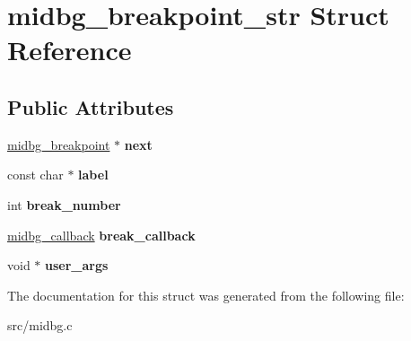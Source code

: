 \hypertarget{structmidbg__breakpoint__str}{\section{midbg\-\_\-breakpoint\-\_\-str Struct Reference}
\label{structmidbg__breakpoint__str}
}
\subsection*{Public Attributes}
\begin{DoxyCompactItemize}
\item 
\hypertarget{structmidbg__breakpoint__str_a5b4f031689f4d84a4a1595e3decefec9}{\hyperlink{structmidbg__breakpoint}{midbg\-\_\-breakpoint} $\ast$ {\bfseries next}}\label{structmidbg__breakpoint__str_a5b4f031689f4d84a4a1595e3decefec9}

\item 
\hypertarget{structmidbg__breakpoint__str_af8a9dab54aed426b08ccf347bef22425}{const char $\ast$ {\bfseries label}}\label{structmidbg__breakpoint__str_af8a9dab54aed426b08ccf347bef22425}

\item 
\hypertarget{structmidbg__breakpoint__str_a3b1c78216b7e95b8aa2ed072250e9a94}{int {\bfseries break\-\_\-number}}\label{structmidbg__breakpoint__str_a3b1c78216b7e95b8aa2ed072250e9a94}

\item 
\hypertarget{structmidbg__breakpoint__str_a459b356a16639d66b80c2b48061d151a}{\hyperlink{midbg_8h_a1adf2f9f07b16e2cd3208b507cfc8e9c}{midbg\-\_\-callback} {\bfseries break\-\_\-callback}}\label{structmidbg__breakpoint__str_a459b356a16639d66b80c2b48061d151a}

\item 
\hypertarget{structmidbg__breakpoint__str_aa59a53bc2213f491b386496d40ad2cf1}{void $\ast$ {\bfseries user\-\_\-args}}\label{structmidbg__breakpoint__str_aa59a53bc2213f491b386496d40ad2cf1}

\end{DoxyCompactItemize}


The documentation for this struct was generated from the following file\-:\begin{DoxyCompactItemize}
\item 
src/midbg.\-c\end{DoxyCompactItemize}
